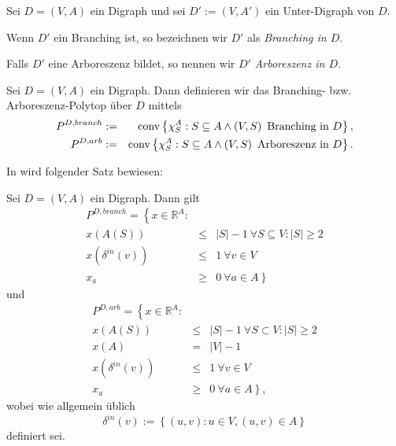 \documentclass[10p,a4paper,BCOR = 12mm, DIV=15]{scrbook}
\begin{document}
{\begin{Def}
Sei $D=\left(V, A\right)$ ein Digraph und sei $D':=\left(V, A'\right)$ ein Unter-Digraph von $D$.

Wenn $D'$ ein Branching ist, so bezeichnen wir $D'$ als \emph{Branching in $D$}.

Falls $D'$ eine Arboreszenz bildet, so nennen wir $D'$ \emph{Arboreszenz in $D$}.
\end{Def}

\begin{Def}
Sei $D=\left(V, A\right)$ ein Digraph. Dann definieren wir das Branching- bzw. Arbores\-zenz-Polytop über $D$ mittels
\begin{eqnarray*}
P^{D, branch} & := & \operatorname{conv} \left\{\chi^A_{S}: S \subseteq A \wedge \left(V, S\right) \textnormal{ Branching in }D\right\}, \\
P^{D, arb} & := & \operatorname{conv} \left\{\chi^A_{S}: S \subseteq A \wedge \left(V, S\right) \textnormal{ Arboreszenz in }D\right\}.
\end{eqnarray*}
\end{Def}

In \cite{schrijver2003combinatorial} wird folgender Satz bewiesen:
\begin{Sa}
Sei $D=\left(V, A\right)$ ein Digraph. Dann gilt
\begin{eqnarray*}
P^{D, branch} = \left\{x \in \mathbb{R}^A: \right. & & \\
x\left(A\left(S\right)\right) & \leq & \left|S\right| - 1 \ \forall S \subseteq V: \left|S\right| \geq 2 \\
x\left(\delta^{in}\left(v\right)\right) & \leq & 1 \ \forall v \in V \\
x_a & \geq & \left. 0 \ \forall a \in A\right\}
\end{eqnarray*}
und
\begin{eqnarray*}
P^{D, arb} = \left\{x \in \mathbb{R}^A: \right. & & \\
x\left(A\left(S\right)\right) & \leq & \left|S\right| - 1 \ \forall S \subset V: \left|S\right| \geq 2 \\
x\left(A\right) & = & \left|V\right| - 1 \\
x\left(\delta^{in}\left(v\right)\right) & \leq & 1 \ \forall v \in V \\
x_a & \geq & \left. 0 \ \forall a \in A\right\},
\end{eqnarray*}
wobei wie allgemein üblich
\begin{displaymath}
\delta^{in}\left(v\right) := \left\{\left(u, v\right): u \in V, \left(u, v\right) \in A\right\}
\end{displaymath}
definiert sei.
\end{Sa}

}
\end{document}
